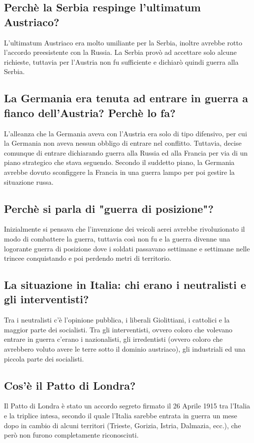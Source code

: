 \documentclass{article}
\begin{document}
\subsection{Perchè la Serbia respinge l'ultimatum Austriaco?}
L'ultimatum Austriaco era molto umiliante per la Serbia, inoltre avrebbe rotto l'accordo preesistente con la Russia.
La Serbia provò ad accettare solo alcune richieste, tuttavia per l'Austria non fu sufficiente e dichiarò quindi guerra
alla Serbia.

\subsection{La Germania era tenuta ad entrare in guerra a fianco dell'Austria? Perchè lo fa?}
L'alleanza che la Germania aveva con l'Austria era solo di tipo difensivo, per cui la Germania non aveva nessun obbligo
di entrare nel conflitto. Tuttavia, decise comunque di entrare dichiarando guerra alla Russia ed alla Francia per via
di un piano strategico che stava seguendo. Secondo il suddetto piano, la Germania avrebbe dovuto sconfiggere la Francia
in una guerra lampo per poi gestire la situazione russa.

\subsection{Perchè si parla di "guerra di posizione"?}
Inizialmente si pensava che l'invenzione dei veicoli aerei avrebbe rivoluzionato il modo di combattere la guerra,
tuttavia così non fu e la guerra divenne una logorante guerra di posizione dove i soldati passavano settimane
e settimane nelle trincee conquistando e poi perdendo metri di territorio.

\subsection{La situazione in Italia: chi erano i neutralisti e gli interventisti?}
Tra i neutralisti c'è l'opinione pubblica, i liberali Giolittiani, i cattolici e la maggior parte dei socialisti. Tra gli
interventisti, ovvero coloro che volevano entrare in guerra c'erano i nazionalisti, gli irredentisti (ovvero coloro che
avrebbero voluto avere le terre sotto il dominio austriaco), gli industriali ed una piccola parte dei socialisti.

\subsection{Cos'è il Patto di Londra?}
Il Patto di Londra è stato un accordo segreto firmato il 26 Aprile 1915 tra l'Italia e la triplice intesa, secondo il quale
l'Italia sarebbe entrata in guerra un mese dopo in cambio di alcuni territori (Trieste, Gorizia, Istria, Dalmazia, ecc.),
che però non furono completamente riconosciuti.
\end{document}
